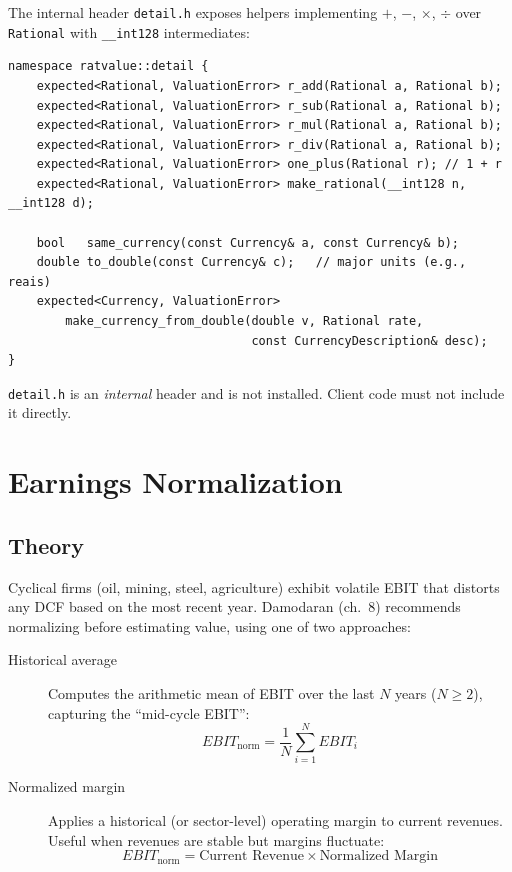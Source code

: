 \documentclass[12pt, a4paper, oneside]{book}
\begin{document}
The internal header \texttt{detail.h} exposes helpers implementing
$+$, $-$, $\times$, $\div$ over \texttt{Rational} with
\texttt{\_\_int128} intermediates:

\begin{lstlisting}[style=cpp]
namespace ratvalue::detail {
    expected<Rational, ValuationError> r_add(Rational a, Rational b);
    expected<Rational, ValuationError> r_sub(Rational a, Rational b);
    expected<Rational, ValuationError> r_mul(Rational a, Rational b);
    expected<Rational, ValuationError> r_div(Rational a, Rational b);
    expected<Rational, ValuationError> one_plus(Rational r); // 1 + r
    expected<Rational, ValuationError> make_rational(__int128 n, __int128 d);

    bool   same_currency(const Currency& a, const Currency& b);
    double to_double(const Currency& c);   // major units (e.g., reais)
    expected<Currency, ValuationError>
        make_currency_from_double(double v, Rational rate,
                                  const CurrencyDescription& desc);
}
\end{lstlisting}

\begin{warning}
\texttt{detail.h} is an \emph{internal} header and is not installed.
Client code must not include it directly.
\end{warning}

\chapter{Earnings Normalization}

\section{Theory}

Cyclical firms (oil, mining, steel, agriculture) exhibit volatile EBIT that
distorts any DCF based on the most recent year. Damodaran (ch.~8) recommends
normalizing before estimating value, using one of two approaches:

\begin{description}
  \item[Historical average]
    Computes the arithmetic mean of EBIT over the last $N$ years ($N \geq 2$),
    capturing the ``mid-cycle EBIT'':
    \[
      EBIT_{\text{norm}} = \frac{1}{N} \sum_{i=1}^{N} EBIT_i
    \]

  \item[Normalized margin]
    Applies a historical (or sector-level) operating margin to current revenues.
    Useful when revenues are stable but margins fluctuate:
    \[
      EBIT_{\text{norm}} = \text{Current Revenue} \times \text{Normalized Margin}
    \]
\end{description}
\end{document}
